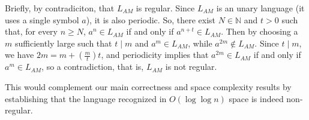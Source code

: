\documentclass[UTF8]{article}
\begin{document}
Briefly, by contradiciton, that $L_{AM}$ is regular. Since $L_{AM}$ is an unary language (it uses a single symbol $a$), it is also periodic. So, there exist $N\in\mathbb{N}$ and $t > 0$ such that, for every $n\geq N$, $a^n\in L_{AM}$ if and only if $a^{n+t}\in L_{AM}$. Then by choosing a $m$ sufficiently large such that $t \mid m$ and $a^m\in L_{AM}$, while $a^{2m} \notin L_{AM}$. Since $t\mid m$, we have $2m = m + (\frac{m}{t}) t$, and periodicity implies that $a^{2m} \in L_{AM}$ if and only if $a^m\in L_{AM}$, so a contradiction, that is, $L_{AM}$ is not regular.

This would complement our main correctness and space
complexity results by establishing that the language
recognized in $O(\log\log n)$ space is indeed non-regular.

\newpage

\newpage



\end{document}
